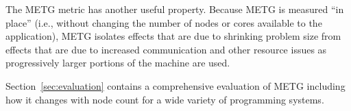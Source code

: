 The METG metric has another useful property. Because METG is measured ``in place'' (i.e.,
without changing the number of nodes or cores available to the
application), METG isolates effects that are
due to shrinking problem size from effects that are due to
increased communication and other resource issues as
progressively larger portions of the machine are used.

Section~\ref{sec:evaluation} contains a comprehensive evaluation of
METG including how it changes with node count for a wide variety of
programming systems.
